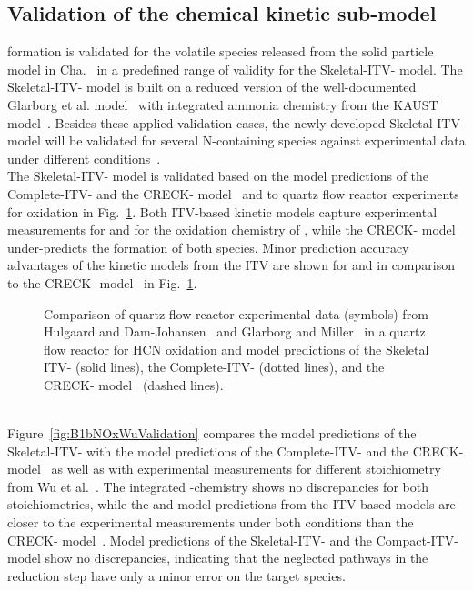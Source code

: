 \begin{refsection}
\subsection{Validation of the  chemical kinetic sub-model}
formation is validated for the volatile species released from the solid particle model in Cha.~ in a predefined range of validity for the Skeletal-ITV- model. The Skeletal-ITV- model is built on a reduced version of the well-documented Glarborg et al. model~\cite{Glarborg2022} with integrated ammonia chemistry from the KAUST model~\cite{Zhang2021}. Besides these applied validation cases, the newly developed Skeletal-ITV- model will be validated for several N-containing species against experimental data under different conditions~\cite{Hulgaard199, Glarborg1994, Alzueta2002, Wu2019, Wu2022}.
\\
The Skeletal-ITV- model is validated based on the model predictions of the Complete-ITV- and the CRECK- model~\cite{Shamooni2021} and to quartz flow reactor experiments for  oxidation in Fig.~\ref{fig:B1bNOxBaseChemistry}. Both ITV-based kinetic models capture experimental measurements for  and for the oxidation chemistry of , while the CRECK- model~\cite{Shamooni2021} under-predicts the formation of both species. Minor prediction accuracy advantages of the kinetic models from the ITV are shown for  and  in comparison to the CRECK- model~\cite{Shamooni2021} in Fig.~\ref{fig:B1bNOxBaseChemistry}.
\begin{figure}[h]
  \centering
  \hfill
  \caption{Comparison of quartz flow reactor experimental data (symbols) from Hulgaard and Dam-Johansen~\cite{Hulgaard199} and Glarborg and Miller~\cite{Glarborg1994} in a quartz flow reactor for HCN oxidation and model predictions of the Skeletal ITV- (solid lines), the Complete-ITV- (dotted lines), and the CRECK- model~\cite{Shamooni2021} (dashed lines).}
  \label{fig:B1bNOxBaseChemistry}
\end{figure}
\\
Figure~\ref{fig:B1bNOxWuValidation} compares the model predictions of the Skeletal-ITV- with the model predictions of the Complete-ITV- and the CRECK- model~\cite{Shamooni2021} as well as with experimental measurements for different stoichiometry from Wu et al.~\cite{Wu2019, Wu2022}. The integrated -chemistry shows no discrepancies for both stoichiometries, while the  and  model predictions from the ITV-based models are closer to the experimental measurements under both conditions than the CRECK- model~\cite{Shamooni2021}. Model predictions of the Skeletal-ITV- and the Compact-ITV- model show no discrepancies, indicating that the neglected pathways in the reduction step have only a minor error on the target species.

\end{refsection}
